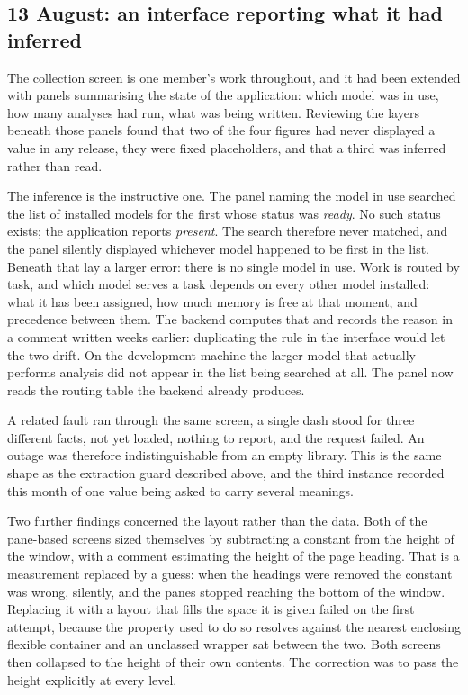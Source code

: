 \documentclass[11pt,a4paper]{article}
\begin{document}
\subsection{13 August: an interface reporting what it had inferred}

The collection screen is one member's work throughout, and it had been extended
with panels summarising the state of the application: which model was in use,
how many analyses had run, what was being written. Reviewing the layers beneath
those panels found that two of the four figures had never displayed a value in
any release, they were fixed placeholders, and that a third was inferred
rather than read.

The inference is the instructive one. The panel naming the model in use
searched the list of installed models for the first whose status was
\emph{ready}. No such status exists; the application reports \emph{present}.
The search therefore never matched, and the panel silently displayed whichever
model happened to be first in the list. Beneath that lay a larger error: there
is no single model in use. Work is routed by task, and which model serves a
task depends on every other model installed: what it has been assigned, how
much memory is free at that moment, and precedence between them. The backend
computes that and records the reason in a comment written weeks earlier:
duplicating the rule in the interface would let the two drift. On the
development machine the larger model that actually performs analysis did not
appear in the list being searched at all. The panel now reads the routing table
the backend already produces.

A related fault ran through the same screen, a single dash stood for three
different facts, not yet loaded, nothing to report, and the request failed.
An outage was therefore indistinguishable from an empty library. This is the
same shape as the extraction guard described above, and the third instance
recorded this month of one value being asked to carry several meanings.

Two further findings concerned the layout rather than the data. Both of the
pane-based screens sized themselves by subtracting a constant from the height
of the window, with a comment estimating the height of the page heading. That
is a measurement replaced by a guess: when the headings were removed the
constant was wrong, silently, and the panes stopped reaching the bottom of the
window. Replacing it with a layout that fills the space it is given failed on
the first attempt, because the property used to do so resolves against the
nearest enclosing flexible container and an unclassed wrapper sat between the
two. Both screens then collapsed to the height of their own contents. The
correction was to pass the height explicitly at every level.
\end{document}
